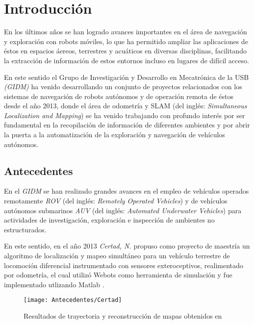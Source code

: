 \chapter{Introducción}
\label{capitulo1}

En los últimos años se han logrado avances importantes en el área de navegación y exploración con robots móviles, lo que ha permitido ampliar las aplicaciones de éstos en espacios áereos, terrestres y acuáticos en diversas disciplinas, facilitando la extracción de información de estos entornos incluso en lugares de difícil acceso.

En este sentido el Grupo de Investigación y Desarrollo en Mecatrónica de la USB \textit{(GIDM)} ha venido desarrollando un conjunto de proyectos relacionados con los sistemas de navegación de robots autónomos y de operación remota de éstos desde el año 2013, donde el área de odometría y SLAM (del inglés: \textit{Simultaneous Localization and Mapping}) se ha venido trabajando con profundo interés por ser fundamental en la recopilación de información de diferentes ambientes y por abrir la puerta a la automatización de la exploración y navegación de vehículos autónomos.

\section{Antecedentes}

En el \textit{GIDM} se han realizado grandes avances en el empleo de vehículos operados remotamente \textit{ROV} (del inglés: \textit{Remotely Operated Vehicles}) y de vehículos autónomos submarinos \textit{AUV} (del inglés: \textit{Automated Underwater Vehicles}) para actividades de investigación, exploración e inspección de ambientes no estructurados.

En este sentido, en el año 2013 \textit{Certad, N.} \cite{novel} propuso como proyecto de maestría un algoritmo de localización y mapeo simultáneo para un vehículo terrestre de locomoción diferencial instrumentado con sensores exteroceptivos, realimentado por odometría, el cual utilizó Webots como herramienta de simulación y fue implementado utlizando Matlab \textregistered.


\begin{figure}[H]
	\centering
	\texttt{[image: Antecedentes/Certad]}
	\caption{Resultados de trayectoria y reconstrucción de mapas obtenidos en \cite{novel}}
	\label{imagen:Antecedentes/Certad}
\end{figure}

